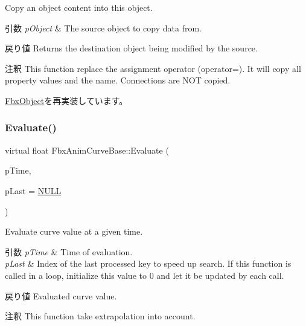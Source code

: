 Copy an object content into this object. 
\begin{DoxyParams}{引数}
{\em p\+Object} & The source object to copy data from. \\
\hline
\end{DoxyParams}
\begin{DoxyReturn}{戻り値}
Returns the destination object being modified by the source. 
\end{DoxyReturn}
\begin{DoxyRemark}{注釈}
This function replace the assignment operator (operator=). It will copy all property values and the name. Connections are N\+OT copied. 
\end{DoxyRemark}


\hyperlink{class_fbx_object_a0c0c5adb38284d14bb82c04d54504a3e}{Fbx\+Object}を再実装しています。

\mbox{\label{class_fbx_anim_curve_base_a6d31c045a3733067fc7b4e6416d2fe06}} 
\subsubsection{\texorpdfstring{Evaluate()}{Evaluate()}}
{\footnotesize\ttfamily virtual float Fbx\+Anim\+Curve\+Base\+::\+Evaluate (\begin{DoxyParamCaption}\item[{\hyperlink{class_fbx_time}{Fbx\+Time}}]{p\+Time,  }\item[{int $\ast$}]{p\+Last = {\ttfamily \hyperlink{fbxarch_8h_a070d2ce7b6bb7e5c05602aa8c308d0c4}{N\+U\+LL}} }\end{DoxyParamCaption})\hspace{0.3cm}{\ttfamily [pure virtual]}}

Evaluate curve value at a given time. 
\begin{DoxyParams}{引数}
{\em p\+Time} & Time of evaluation. \\
\hline
{\em p\+Last} & Index of the last processed key to speed up search. If this function is called in a loop, initialize this value to 0 and let it be updated by each call. \\
\hline
\end{DoxyParams}
\begin{DoxyReturn}{戻り値}
Evaluated curve value. 
\end{DoxyReturn}
\begin{DoxyRemark}{注釈}
This function take extrapolation into account. 
\end{DoxyRemark}



